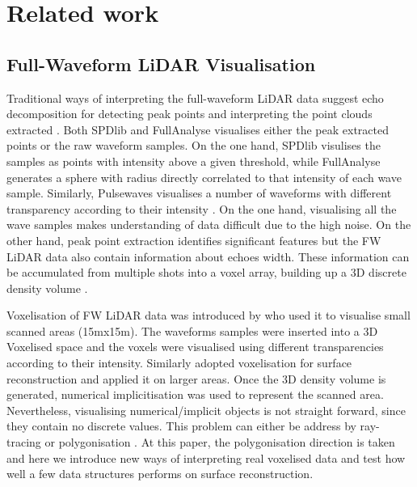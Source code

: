 \documentclass{subfiles}
\begin{document}
\section{Related work}
\subsection{Full-Waveform LiDAR Visualisation}

\par Traditional ways of interpreting the full-waveform LiDAR data suggest echo decomposition for detecting peak points and interpreting the point clouds extracted \cite{Wanger2006}. Both SPDlib \cite{Bunting2013} and FullAnalyse \cite{Chauve2009} visualises either the peak extracted points or the raw waveform samples. On the one hand, SPDlib visulises the samples as points with intensity above a given threshold, while FullAnalyse generates a sphere with radius directly correlated to that intensity of each wave sample. Similarly, Pulsewaves visualises a number of waveforms with different transparency according to their intensity \cite{Isenburg2012Pulsewaves}. {\color{blue}
On the one hand, visualising all the wave samples makes understanding of data difficult due to the high noise. On the other hand, peak point extraction identifies significant features but the FW LiDAR data also contain information about echoes width. These information can be accumulated from multiple shots into a voxel array, building up a 3D discrete density volume \cite{Miltiadou2014}.} 
\par Voxelisation of FW LiDAR data was introduced by \cite{Persson2005} who used it to visualise small scanned areas (15mx15m). The waveforms samples were inserted into a 3D Voxelised space and the voxels were visualised using different transparencies according to their intensity. Similarly \cite{Miltiadou2014} adopted voxelisation for surface reconstruction and applied it on larger areas. Once the 3D density volume is generated, numerical implicitisation was used to represent the scanned area. Nevertheless, visualising numerical/implicit objects is not straight forward, since they contain no discrete values. This problem can either be address by ray-tracing \cite{Hanrahan1983} or polygonisation \cite{Lorensen1987}. At this paper, the polygonisation direction is taken and here we introduce new ways of interpreting real voxelised data {\color{blue} and test how well a few data structures performs on surface reconstruction.} 
\end{document}
